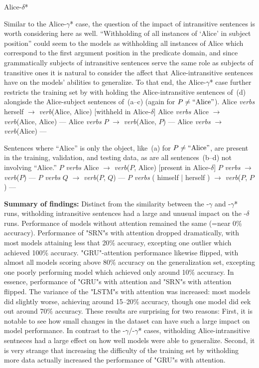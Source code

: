\ssec Alice-$\delta$*

Similar to the Alice-$\gamma$* case, the question of the impact of intransitive
sentences is worth considering here as well. ``Withholding of all instances of
`Alice' in subject position'' could seem to the models as withholding all 
instances of Alice which correspond to the first argument position in the
predicate domain, and since grammatically subjects of intransitive sentences
serve the same role as subjects of transitive ones it is natural to consider
the affect that Alice-intransitive sentences have on the models' abilities
to generalize. To that end, the Alice-$\gamma$* case further restricts the
training set by with holding the Alice-intransitive sentences of~(\nextx d)
alongisde the Alice-subject sentences of~(\nextx a--c) (again for 
$P \not= \hbox{``Alice''}$).
\pex
	\a Alice {\em verbs} herself $\to$ {\em verb}(Alice, Alice) \hfill [withheld
	   in Alice-$\delta$]
	\a Alice {\em verbs} Alice $\to$ {\em verb}(Alice, Alice) \hfill ---
	\a Alice {\em verbs} $P$ $\to$ {\em verb}(Alice, $P$) \hfill ---
	\a Alice {\em verbs} $\to$ {\em verb}(Alice) \hfill ---
\xe

Sentences where ``Alice'' is only the object, like~(\nextx a) for 
$P \not= \hbox{``Alice''}$, are present in the training, validation, and 
testing data, as are all sentences~(\nextx b--d) not involving ``Alice.''
\pex
	\a $P$ {\em verbs} Alice $\to$ {\em verb}($P$, Alice) \hfill [present in Alice-$\delta$]
	\a $P$ {\em verbs} $\to$ {\em verb}($P$) \hfill ---
	\a $P$ {\em verbs} $Q$ $\to$ {\em verb}($P$, $Q$) \hfill ---
	\a $P$ {\em verbs} ( himself | herself ) $\to$ {\em verb}($P$, $P$) \hfill ---
\xe

{\bf Summary of findings:} Distinct from the similarity between the -$\gamma$
and -$\gamma$* runs, witholding intransitive sentences had a large and unusual
impact on the -$\delta$ runs. Performance of models without attention remained
the same (=near 0\% accuracy). Performance of "SRN"s with attention dropped
dramatically, with most models attaining less that 20\% accuracy, excepting one
outlier which achieved 100\% accuracy. "GRU"-attention performance likewise 
flipped, with almost all models scoring above 80\% accuracy on the 
generalization set, excepting one poorly performing model which achieved only 
around 10\% accuracy. In essence, performance of "GRU"s with attention and
"SRN"s with attention flipped. The variance of the "LSTM"s with attention was
increased: most models did slightly worse, achieving around 15--20\% accuracy,
though one model did eek out around 70\% accuracy. These results are surprising
for two reasons: First, it is notable to see how small changes in the dataset
can have such a large impact on model performance. In contrast to the -$\gamma$/-$\gamma$* cases, witholding Alice-intransitive sentneces had a large effect
on how well models were able to generalize. Second, it is very strange that
increasing the difficulty of the training set by witholding more data actually
increased the performance of "GRU"s with attention.


